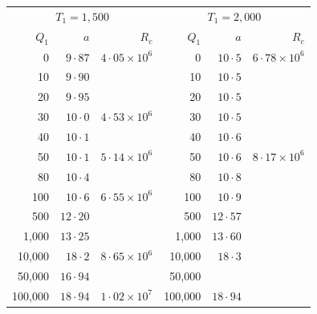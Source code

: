 \begin{table}[p]
\bigskip
\begin{tabular}{r@{\quad}r@{\quad}r|r@{\quad}r@{\quad}r}
\hline
\multicolumn{3}{c|}{$T_1 = 1{,}500$} & \multicolumn{3}{c}{$T_1 = 2{,}000$} \\
$Q_1$ & $a$ & $R_c$ & $Q_1$ & $a$ & $R_c$ \\
\hline
 0    & $9{\cdot}87$  & $4{\cdot}05\times10^{6}$ & 0    & $10{\cdot}5$ & $6{\cdot}78\times10^{6}$\\
 10   & $9{\cdot}90$  &                          & 10   & $10{\cdot}5$ &           \\
 20   & $9{\cdot}95$  &                          & 20   & $10{\cdot}5$ &           \\
 30   & $10{\cdot}0$  & $4{\cdot}53\times10^{6}$ & 30   & $10{\cdot}5$ &           \\
 40   & $10{\cdot}1$  &                          & 40   & $10{\cdot}6$ &           \\
 50   & $10{\cdot}1$  & $5{\cdot}14\times10^{6}$ & 50   & $10{\cdot}6$ & $8{\cdot}17\times10^{6}$\\
 80   & $10{\cdot}4$  &                          & 80   & $10{\cdot}8$ &           \\
 100  & $10{\cdot}6$  & $6{\cdot}55\times10^{6}$ & 100  & $10{\cdot}9$ &           \\
 500  & $12{\cdot}20$ &                          & 500  & $12{\cdot}57$ &          \\
 1{,}000 & $13{\cdot}25$ &                       & 1{,}000 & $13{\cdot}60$ &       \\
 10{,}000 & $18{\cdot}2$ &$8{\cdot}65\times10^{6}$& 10{,}000 & $18{\cdot}3$ &     \\
 50{,}000 & $16{\cdot}94$ &                      & 50{,}000 &              &       \\
 100{,}000 & $18{\cdot}94$ & $1{\cdot}02\times10^{7}$ & 100{,}000 & $18{\cdot}94$ & \\
\hline
\end{tabular}


\end{table}
